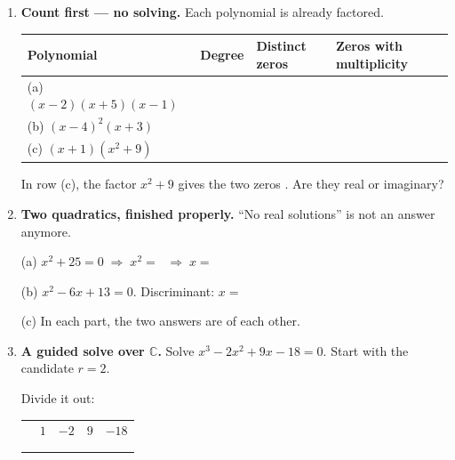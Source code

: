 \documentclass[10pt]{article}
\begin{document}
\begin{tcolorbox}[colback=white, colframe=black!40, title=\textbf{Tier R --- Remediate},
    fonttitle=\bfseries, arc=1.5mm, left=3mm, right=3mm, top=2mm, bottom=2mm, breakable]
\begin{enumerate}[leftmargin=1.7em, itemsep=9pt]
  \item \textbf{Count first --- no solving.} Each polynomial is already factored.

    \vspace{3pt}
    \renewcommand{\arraystretch}{1.5}
    \begin{tabularx}{\linewidth}{|X|C{1.8cm}|C{3.6cm}|C{3.4cm}|}
    \hline
    \textbf{Polynomial} & \textbf{Degree} & \textbf{Distinct zeros} & \textbf{Zeros with multiplicity} \\ \hline
    (a) $(x-2)(x+5)(x-1)$ & & & \\ \hline
    (b) $(x-4)^2(x+3)$    & & & \\ \hline
    (c) $(x+1)(x^2+9)$    & & & \\ \hline
    \end{tabularx}

    \vspace{3pt}
    In row (c), the factor $x^2+9$ gives the two zeros \blank{2.4cm}. Are they real or imaginary?
    \blank{2.0cm}

  \item \textbf{Two quadratics, finished properly.} ``No real solutions'' is not an answer anymore.

    \vspace{2pt}
    (a) $x^2 + 25 = 0 \;\Rightarrow\; x^2 = $ \blank{1.2cm} $\;\Rightarrow\; x = $ \blank{2.4cm}

    \vspace{2pt}
    (b) $x^2 - 6x + 13 = 0$. \quad Discriminant: \blank{1.6cm} \quad $x = $ \blank{3.0cm}

    \vspace{2pt}
    (c) In each part, the two answers are \blank{3.0cm} of each other.

  \item \textbf{A guided solve over $\mathbb{C}$.} Solve $x^3 - 2x^2 + 9x - 18 = 0$. Start with the
    candidate $r = 2$.

    \vspace{2pt}
    Divide it out:
    \begin{center}
    \renewcommand{\arraystretch}{1.6}
    \begin{tabular}{r|C{1.4cm}C{1.4cm}C{1.4cm}C{1.4cm}}
        & $1$ & $-2$ & $9$ & $-18$ \\
        &     &      &     &       \\ 
        &     &      &     &       \\
    \end{tabular}
    \end{center}


\end{enumerate}
\end{tcolorbox}
\end{document}
